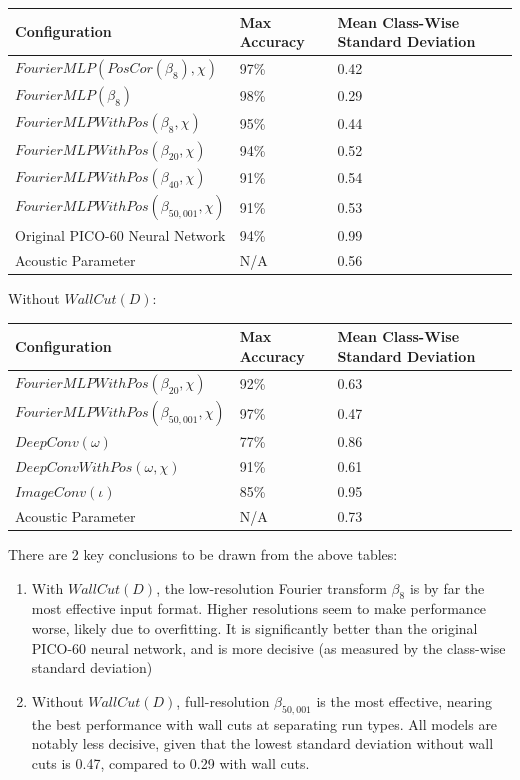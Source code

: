 \documentclass[10pt]{article}
\begin{document}
\begin{tabular}{|l|l|l|}
    \hline
    Configuration & Max Accuracy & Mean Class-Wise Standard Deviation \\
    \hline
    $FourierMLP(PosCor(\beta_{8}), \chi)$ & 97\% & 0.42 \\
    \hline
    $FourierMLP(\beta_{8})$ & 98\% & 0.29 \\
    \hline
    $FourierMLPWithPos(\beta_{8}, \chi)$ & 95\% & 0.44 \\
    \hline
    $FourierMLPWithPos(\beta_{20}, \chi)$ & 94\% & 0.52 \\
    \hline
    $FourierMLPWithPos(\beta_{40}, \chi)$ & 91\% & 0.54 \\
    \hline
    $FourierMLPWithPos(\beta_{50,001}, \chi)$ & 91\% & 0.53 \\
    \hline
    Original PICO-60 Neural Network & 94\% & 0.99 \\
    \hline
    Acoustic Parameter & N/A & 0.56 \\
    \hline
\end{tabular}

Without $WallCut(D)$:

\begin{tabular}{|l|l|l|}
    \hline
    Configuration & Max Accuracy & Mean Class-Wise Standard Deviation \\
    \hline
    $FourierMLPWithPos(\beta_{20}, \chi)$ & 92\% & 0.63 \\
    \hline
    $FourierMLPWithPos(\beta_{50,001}, \chi)$ & 97\% & 0.47 \\
    \hline
    $DeepConv(\omega)$ & 77\% & 0.86 \\
    \hline
    $DeepConvWithPos(\omega, \chi)$ & 91\% & 0.61 \\
    \hline
    $ImageConv(\iota)$ & 85\% & 0.95 \\
    \hline
    Acoustic Parameter & N/A & 0.73 \\
    \hline
\end{tabular}

There are 2 key conclusions to be drawn from the above tables:

\begin{enumerate}
    \item With $WallCut(D)$, the low-resolution Fourier transform $\beta_{8}$ is by far the most effective input format. Higher resolutions seem to make performance worse, likely due to overfitting. It is significantly better than the original PICO-60 neural network, and is more decisive (as measured by the class-wise standard deviation)
    \item Without $WallCut(D)$, full-resolution $\beta_{50,001}$ is the most effective, nearing the best performance with wall cuts at separating run types. All models are notably less decisive, given that the lowest standard deviation without wall cuts is 0.47, compared to 0.29 with wall cuts.
\end{enumerate}
\end{document}
